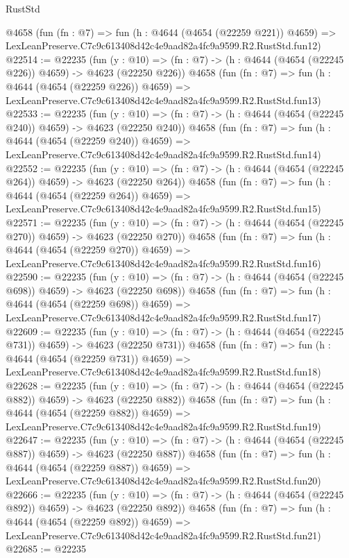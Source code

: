 \begin{lexlean}{RustStd}
\begin{coremodule}
    @4658
    (fun (fn : @7) =>
    fun (h : @4644 (@4654 (@22259 @221)) @4659) =>
    LexLeanPreserve.C7c9c613408d42c4e9aad82a4fc9a9599.R2.RustStd.fun12)
@22514 := @22235
    (fun (y : @10) => (fn : @7) -> (h : @4644 (@4654 (@22245 @226)) @4659) -> @4623 (@22250 @226))
    @4658
    (fun (fn : @7) =>
    fun (h : @4644 (@4654 (@22259 @226)) @4659) =>
    LexLeanPreserve.C7c9c613408d42c4e9aad82a4fc9a9599.R2.RustStd.fun13)
@22533 := @22235
    (fun (y : @10) => (fn : @7) -> (h : @4644 (@4654 (@22245 @240)) @4659) -> @4623 (@22250 @240))
    @4658
    (fun (fn : @7) =>
    fun (h : @4644 (@4654 (@22259 @240)) @4659) =>
    LexLeanPreserve.C7c9c613408d42c4e9aad82a4fc9a9599.R2.RustStd.fun14)
@22552 := @22235
    (fun (y : @10) => (fn : @7) -> (h : @4644 (@4654 (@22245 @264)) @4659) -> @4623 (@22250 @264))
    @4658
    (fun (fn : @7) =>
    fun (h : @4644 (@4654 (@22259 @264)) @4659) =>
    LexLeanPreserve.C7c9c613408d42c4e9aad82a4fc9a9599.R2.RustStd.fun15)
@22571 := @22235
    (fun (y : @10) => (fn : @7) -> (h : @4644 (@4654 (@22245 @270)) @4659) -> @4623 (@22250 @270))
    @4658
    (fun (fn : @7) =>
    fun (h : @4644 (@4654 (@22259 @270)) @4659) =>
    LexLeanPreserve.C7c9c613408d42c4e9aad82a4fc9a9599.R2.RustStd.fun16)
@22590 := @22235
    (fun (y : @10) => (fn : @7) -> (h : @4644 (@4654 (@22245 @698)) @4659) -> @4623 (@22250 @698))
    @4658
    (fun (fn : @7) =>
    fun (h : @4644 (@4654 (@22259 @698)) @4659) =>
    LexLeanPreserve.C7c9c613408d42c4e9aad82a4fc9a9599.R2.RustStd.fun17)
@22609 := @22235
    (fun (y : @10) => (fn : @7) -> (h : @4644 (@4654 (@22245 @731)) @4659) -> @4623 (@22250 @731))
    @4658
    (fun (fn : @7) =>
    fun (h : @4644 (@4654 (@22259 @731)) @4659) =>
    LexLeanPreserve.C7c9c613408d42c4e9aad82a4fc9a9599.R2.RustStd.fun18)
@22628 := @22235
    (fun (y : @10) => (fn : @7) -> (h : @4644 (@4654 (@22245 @882)) @4659) -> @4623 (@22250 @882))
    @4658
    (fun (fn : @7) =>
    fun (h : @4644 (@4654 (@22259 @882)) @4659) =>
    LexLeanPreserve.C7c9c613408d42c4e9aad82a4fc9a9599.R2.RustStd.fun19)
@22647 := @22235
    (fun (y : @10) => (fn : @7) -> (h : @4644 (@4654 (@22245 @887)) @4659) -> @4623 (@22250 @887))
    @4658
    (fun (fn : @7) =>
    fun (h : @4644 (@4654 (@22259 @887)) @4659) =>
    LexLeanPreserve.C7c9c613408d42c4e9aad82a4fc9a9599.R2.RustStd.fun20)
@22666 := @22235
    (fun (y : @10) => (fn : @7) -> (h : @4644 (@4654 (@22245 @892)) @4659) -> @4623 (@22250 @892))
    @4658
    (fun (fn : @7) =>
    fun (h : @4644 (@4654 (@22259 @892)) @4659) =>
    LexLeanPreserve.C7c9c613408d42c4e9aad82a4fc9a9599.R2.RustStd.fun21)
@22685 := @22235

\end{coremodule}
\end{lexlean}
